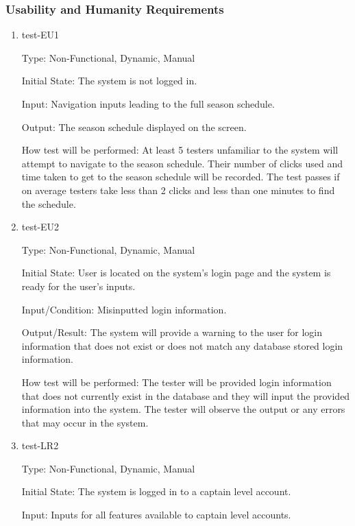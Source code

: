 \documentclass[12pt, titlepage]{article}
\begin{document}
\subsubsection{Usability and Humanity Requirements}

\begin{enumerate}

  \item{test-EU1\\}

  Type: Non-Functional, Dynamic, Manual

  Initial State: The system is not logged in.

  Input: Navigation inputs leading to the full season schedule.

  Output: The season schedule displayed on the screen.

  How test will be performed: At least 5 testers unfamiliar to the system will
  attempt to navigate to the season schedule. Their number of clicks used and
  time taken to get to the season schedule will be recorded. The test passes
  if on average testers take less than 2 clicks and less than one minutes to
  find the schedule.

  \item{test-EU2\\}
  
  Type: Non-Functional, Dynamic, Manual
            
  Initial State: User is located on the system's login page and the system is ready
  for the user's inputs.
            
  Input/Condition: Misinputted login information.
            
  Output/Result: The system will provide a warning to the user for login information that
  does not exist or does not match any database stored login information.
            
  How test will be performed: The tester will be provided login information that does not
  currently exist in the database and they will input the provided information into the
  system. The tester will observe the output or any errors that may occur in the system.

  \item{test-LR2\\}

  Type: Non-Functional, Dynamic, Manual

  Initial State: The system is logged in to a captain level account.

  Input: Inputs for all features available to captain level accounts.


\end{enumerate}
\end{document}
